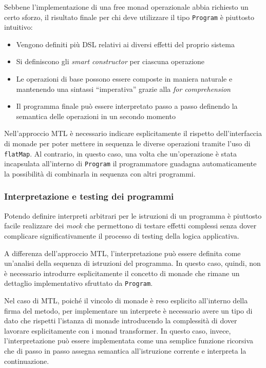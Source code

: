 Sebbene l'implementazione di una free monad operazionale abbia richiesto un certo sforzo, il risultato finale per chi deve utilizzare il tipo \lstinline{Program} è piuttosto intuitivo:
\begin{itemize}
  \item Vengono definiti più DSL relativi ai diversi effetti del proprio sistema
  \item Si definiscono gli \emph{smart constructor} per ciascuna operazione
  \item Le operazioni di base possono essere composte in maniera naturale e mantenendo una sintassi ``imperativa'' grazie alla \emph{for comprehension}
  \item Il programma finale può essere interpretato passo a passo definendo la semantica delle operazioni in un secondo momento
\end{itemize}

Nell'approccio MTL è necessario indicare esplicitamente il rispetto dell'interfaccia di monade per poter mettere in sequenza le diverse operazioni tramite l'uso di \lstinline{flatMap}. Al contrario, in questo caso, una volta che un'operazione è stata incapsulata all'interno di \lstinline{Program} il programmatore guadagna automaticamente la possibilità di combinarla in sequenza con altri programmi.

\subsubsection{Interpretazione e testing dei programmi}
Potendo definire interpreti arbitrari per le istruzioni di un programma è piuttosto facile realizzare dei \emph{mock} che permettono di testare effetti complessi senza dover complicare significativamente il processo di testing della logica applicativa.

A differenza dell'approccio MTL, l'interpretazione può essere definita come un'analisi della sequenza di istruzioni del programma.
In questo caso, quindi, non è necessario introdurre esplicitamente il concetto di monade che rimane un dettaglio implementativo sfruttato da \lstinline{Program}.

Nel caso di MTL, poiché il vincolo di monade è reso esplicito all'interno della firma del metodo, per implementare un interprete è necessario avere un tipo di dato che rispetti l'istanza di monade introducendo la complessità di dover lavorare esplicitamente con i monad transformer.
In questo caso, invece, l'interpretazione può essere implementata come una semplice funzione ricorsiva che di passo in passo assegna semantica all'istruzione corrente e interpreta la continuazione.

